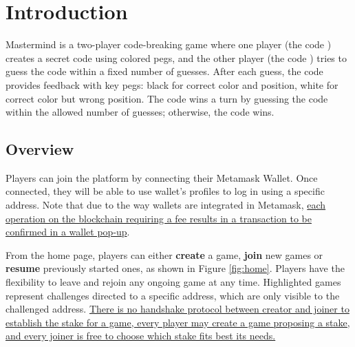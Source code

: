 \chapter{Introduction}

\nl

Mastermind is a two-player code-breaking game where one player (the code ) creates a secret code using colored pegs,
and the other player (the code ) tries to guess the code within a fixed number of guesses. 
After each guess, the code  provides feedback with key pegs: black for correct color and position, white for correct color but wrong position.
The code  wins a turn by guessing the code within the allowed number of guesses; otherwise, the code  wins.

\section{Overview}

Players can join the platform by connecting their Metamask Wallet. Once connected, they will be able to use wallet's profiles to log in using a specific address.
Note that due to the way wallets are integrated in Metamask, \ul{each operation on the blockchain requiring a fee results in a transaction to be confirmed in a wallet pop-up}.

From the home page, players can either \textbf{create} a game, \textbf{join} new games
or \textbf{resume} previously started ones, as shown in Figure \ref{fig:home}. Players have the flexibility to leave and rejoin any ongoing game at any time.
Highlighted games represent challenges directed to a specific address, which are only visible to the challenged address.
\ul{There is no handshake protocol between creator and joiner to establish the stake for a game, every player may create a game proposing a stake, and every joiner is free to choose which stake fits best its needs.}


